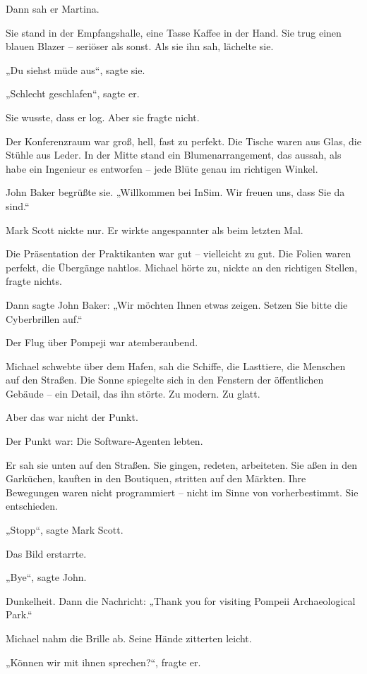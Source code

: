 \documentclass[
]{article}
\begin{document}
Dann sah er Martina.

Sie stand in der Empfangshalle, eine Tasse Kaffee in der Hand. Sie trug einen blauen Blazer -- seriöser als sonst. Als sie ihn sah, lächelte sie.

„Du siehst müde aus``, sagte sie.

„Schlecht geschlafen``, sagte er.

Sie wusste, dass er log. Aber sie fragte nicht.

Der Konferenzraum war groß, hell, fast zu perfekt. Die Tische waren aus Glas, die Stühle aus Leder. In der Mitte stand ein Blumenarrangement, das aussah, als habe ein Ingenieur es entworfen -- jede Blüte genau im richtigen Winkel.

John Baker begrüßte sie. „Willkommen bei InSim. Wir freuen uns, dass Sie da sind.``

Mark Scott nickte nur. Er wirkte angespannter als beim letzten Mal.

Die Präsentation der Praktikanten war gut -- vielleicht zu gut. Die Folien waren perfekt, die Übergänge nahtlos. Michael hörte zu, nickte an den richtigen Stellen, fragte nichts.

Dann sagte John Baker: „Wir möchten Ihnen etwas zeigen. Setzen Sie bitte die Cyberbrillen auf.``

Der Flug über Pompeji war atemberaubend.

Michael schwebte über dem Hafen, sah die Schiffe, die Lasttiere, die Menschen auf den Straßen. Die Sonne spiegelte sich in den Fenstern der öffentlichen Gebäude -- ein Detail, das ihn störte. Zu modern. Zu glatt.

Aber das war nicht der Punkt.

Der Punkt war: Die Software-Agenten lebten.

Er sah sie unten auf den Straßen. Sie gingen, redeten, arbeiteten. Sie aßen in den Garküchen, kauften in den Boutiquen, stritten auf den Märkten. Ihre Bewegungen waren nicht programmiert -- nicht im Sinne von vorherbestimmt. Sie entschieden.

„Stopp``, sagte Mark Scott.

Das Bild erstarrte.

„Bye``, sagte John.

Dunkelheit. Dann die Nachricht: „Thank you for visiting Pompeii Archaeological Park.``

Michael nahm die Brille ab. Seine Hände zitterten leicht.

„Können wir mit ihnen sprechen?{\kern0pt}``, fragte er.
\end{document}

